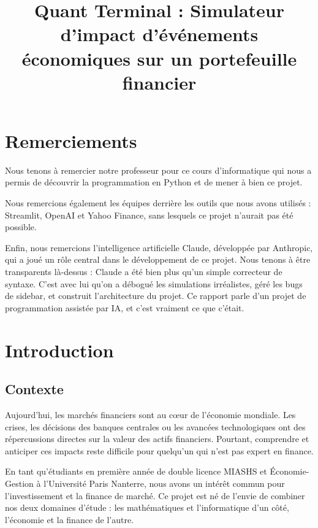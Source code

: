 \documentclass[a4paper, 12pt, twoside]{article}
\title{Quant Terminal : Simulateur d'impact d'événements économiques sur un portefeuille financier}
\begin{document}
\pagedegarde

\section*{Remerciements}

Nous tenons à remercier notre professeur pour ce cours d'informatique qui nous a permis
de découvrir la programmation en Python et de mener à bien ce projet.

Nous remercions également les équipes derrière les outils que nous avons utilisés :
Streamlit, OpenAI et Yahoo Finance, sans lesquels ce projet n'aurait pas été possible.

Enfin, nous remercions l'intelligence artificielle Claude, développée par Anthropic,
qui a joué un rôle central dans le développement de ce projet. Nous tenons à être
transparents là-dessus : Claude a été bien plus qu'un simple correcteur de syntaxe.
C'est avec lui qu'on a débogué les simulations irréalistes, géré les bugs de sidebar,
et construit l'architecture du projet. Ce rapport parle d'un projet de programmation
assistée par IA, et c'est vraiment ce que c'était.

\newpage
\tableofcontents
\newpage

\section{Introduction}

\subsection*{Contexte}

Aujourd'hui, les marchés financiers sont au cœur de l'économie mondiale. Les crises,
les décisions des banques centrales ou les avancées technologiques ont des répercussions
directes sur la valeur des actifs financiers. Pourtant, comprendre et anticiper ces
impacts reste difficile pour quelqu'un qui n'est pas expert en finance.

En tant qu'étudiants en première année de double licence MIASHS et Économie-Gestion
à l'Université Paris Nanterre, nous avons un intérêt commun pour l'investissement et
la finance de marché. Ce projet est né de l'envie de combiner nos deux domaines
d'étude : les mathématiques et l'informatique d'un côté, l'économie et la finance
de l'autre.
\end{document}
